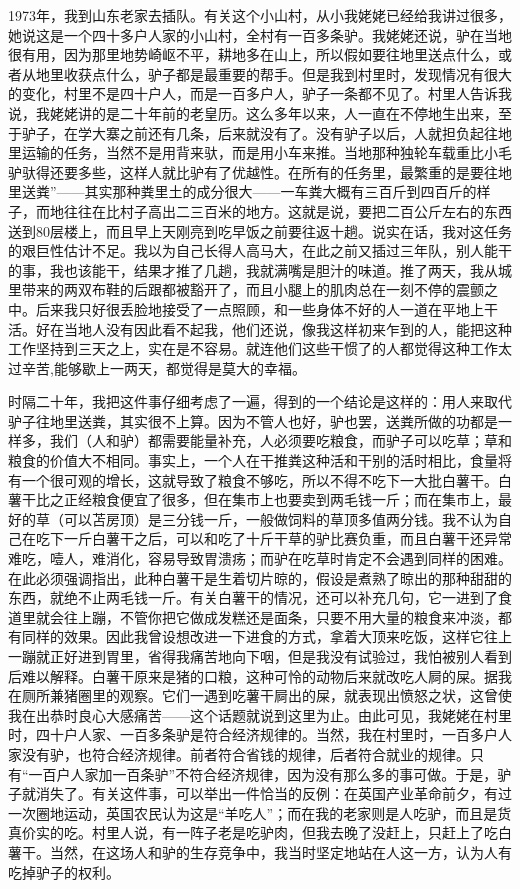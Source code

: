 1973年，我到山东老家去插队。有关这个小山村，从小我姥姥已经给我讲过很多，她说这是一个四十多户人家的小山村，全村有一百多条驴。我姥姥还说，驴在当地很有用，因为那里地势崎岖不平，耕地多在山上，所以假如要往地里送点什么，或者从地里收获点什么，驴子都是最重要的帮手。但是我到村里时，发现情况有很大的变化，村里不是四十户人，而是一百多户人，驴子一条都不见了。村里人告诉我说，我姥姥讲的是二十年前的老皇历。这么多年以来，人一直在不停地生出来，至于驴子，在学大寨之前还有几条，后来就没有了。没有驴子以后，人就担负起往地里运输的任务，当然不是用背来驮，而是用小车来推。当地那种独轮车载重比小毛驴驮得还要多些，这样人就比驴有了优越性。在所有的任务里，最繁重的是要往地里送粪”——其实那种粪里土的成分很大——一车粪大概有三百斤到四百斤的样子，而地往往在比村子高出二三百米的地方。这就是说，要把二百公斤左右的东西送到80层楼上，而且早上天刚亮到吃早饭之前要往返十趟。说实在话，我对这任务的艰巨性估计不足。我以为自己长得人高马大，在此之前又插过三年队，别人能干的事，我也该能干，结果才推了几趟，我就满嘴是胆汁的味道。推了两天，我从城里带来的两双布鞋的后跟都被豁开了，而且小腿上的肌肉总在一刻不停的震颤之中。后来我只好很丢脸地接受了一点照顾，和一些身体不好的人一道在平地上干活。好在当地人没有因此看不起我，他们还说，像我这样初来乍到的人，能把这种工作坚持到三天之上，实在是不容易。就连他们这些干惯了的人都觉得这种工作太过辛苦,能够歇上一两天，都觉得是莫大的幸福。 

时隔二十年，我把这件事仔细考虑了一遍，得到的一个结论是这样的：用人来取代驴子往地里送粪，其实很不上算。因为不管人也好，驴也罢，送粪所做的功都是一样多，我们（人和驴）都需要能量补充，人必须要吃粮食，而驴子可以吃草；草和粮食的价值大不相同。事实上，一个人在干推粪这种活和干别的活时相比，食量将有一个很可观的增长，这就导致了粮食不够吃，所以不得不吃下一大批白薯干。白薯干比之正经粮食便宜了很多，但在集市上也要卖到两毛钱一斤；而在集市上，最好的草（可以苫房顶）是三分钱一斤，一般做饲料的草顶多值两分钱。我不认为自己在吃下一斤白薯干之后，可以和吃了十斤干草的驴比赛负重，而且白薯干还异常难吃，噎人，难消化，容易导致胃溃疡；而驴在吃草时肯定不会遇到同样的困难。在此必须强调指出，此种白薯干是生着切片晾的，假设是煮熟了晾出的那种甜甜的东西，就绝不止两毛钱一斤。有关白薯干的情况，还可以补充几句，它一进到了食道里就会往上蹦，不管你把它做成发糕还是面条，只要不用大量的粮食来冲淡，都有同样的效果。因此我曾设想改进一下进食的方式，拿着大顶来吃饭，这样它往上一蹦就正好进到胃里，省得我痛苦地向下咽，但是我没有试验过，我怕被别人看到后难以解释。白薯干原来是猪的口粮，这种可怜的动物后来就改吃人屙的屎。据我在厕所兼猪圈里的观察。它们一遇到吃薯干屙出的屎，就表现出愤怒之状，这曾使我在出恭时良心大感痛苦——这个话题就说到这里为止。由此可见，我姥姥在村里时，四十户人家、一百多条驴是符合经济规律的。当然，我在村里时，一百多户人家没有驴，也符合经济规律。前者符合省钱的规律，后者符合就业的规律。只有“一百户人家加一百条驴”不符合经济规律，因为没有那么多的事可做。于是，驴子就消失了。有关这件事，可以举出一件恰当的反例：在英国产业革命前夕，有过一次圈地运动，英国农民认为这是“羊吃人”；而在我的老家则是人吃驴，而且是货真价实的吃。村里人说，有一阵子老是吃驴肉，但我去晚了没赶上，只赶上了吃白薯干。当然，在这场人和驴的生存竞争中，我当时坚定地站在人这一方，认为人有吃掉驴子的权利。 


